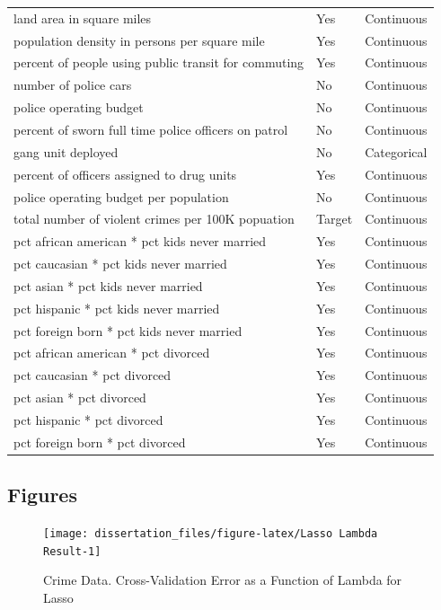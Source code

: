 \documentclass[
  11pt,
]{article}
\begin{document}
\begin{longtable}[t]{lll}
land area in square miles & Yes & Continuous\\
population density in persons per square mile & Yes & Continuous\\
\addlinespace
percent of people using public transit for commuting & Yes & Continuous\\
number of police cars & No & Continuous\\
police operating budget & No & Continuous\\
percent of sworn full time police officers on patrol & No & Continuous\\
gang unit deployed & No & Categorical\\
\addlinespace
percent of officers assigned to drug units & Yes & Continuous\\
police operating budget per population & No & Continuous\\
total number of violent crimes per 100K popuation & Target & Continuous\\
pct african american * pct kids never married & Yes & Continuous\\
pct caucasian * pct kids never married & Yes & Continuous\\
\addlinespace
pct asian * pct kids never married & Yes & Continuous\\
pct hispanic * pct kids never married & Yes & Continuous\\
pct foreign born * pct kids never married & Yes & Continuous\\
pct african american * pct divorced & Yes & Continuous\\
pct caucasian * pct divorced & Yes & Continuous\\
\addlinespace
pct asian * pct divorced & Yes & Continuous\\
pct hispanic * pct divorced & Yes & Continuous\\
pct foreign born * pct divorced & Yes & Continuous\\*
\end{longtable}

\subsection{Figures}

\begin{figure}[H]

{\centering \texttt{[image: dissertation\_files/figure-latex/Lasso Lambda Result-1]} 

}

\caption{Crime Data. Cross-Validation Error as a Function of Lambda for Lasso}\label{fig:Lasso Lambda Result}
\end{figure}
\end{document}
